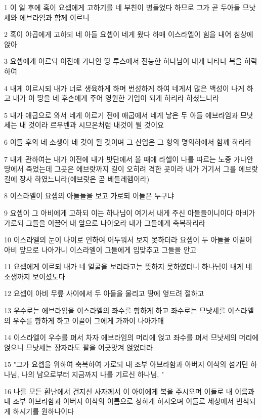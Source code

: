 \par 1 이 일 후에 혹이 요셉에게 고하기를 네 부친이 병들었다 하므로 그가 곧 두아들 므낫세와 에브라임과 함께 이르니
\par 2 혹이 야곱에게 고하되 네 아들 요셉이 네게 왔다 하매 이스라엘이 힘을 내어 침상에 앉아
\par 3 요셉에게 이르되 이전에 가나안 땅 루스에서 전능한 하나님이 내게 나타나 복을 허락하여
\par 4 내게 이르시되 내가 너로 생육하게 하며 번성하게 하여 네게서 많은 백성이 나게 하고 내가 이 땅을 네 후손에게 주어 영원한 기업이 되게 하리라 하셨느니라
\par 5 내가 애굽으로 와서 네게 이르기 전에 애굽에서 네게 낳은 두 아들 에브라임과 므낫세는 내 것이라 르우벤과 시므온처럼 내것이 될 것이요
\par 6 이들 후의 네 소생이 네 것이 될 것이며 그 산업은 그 형의 명의하에서 함께 하리라
\par 7 내게 관하여는 내가 이전에 내가 밧단에서 올 때에 라헬이 나를 따르는 노중 가나안 땅에서 죽었는데 그곳은 에브랏까지 길이 오히려 격한 곳이라 내가 거기서 그를 에브랏 길에 장사 하였느니라(에브랏은 곧 베들레헴이라)
\par 8 이스라엘이 요셉의 아들들을 보고 가로되 이들은 누구냐
\par 9 요셉이 그 아비에게 고하되 이는 하나님이 여기서 내게 주신 아들들이니이다 아비가 가로되 그들을 이끌어 내 앞으로 나아오라 내가 그들에게 축복하리라
\par 10 이스라엘의 눈이 나이로 인하여 어두워서 보지 못하더라 요셉이 두 아들을 이끌어 아비 앞으로 나아가니 이스라엘이 그들에게 입맞추고 그들을 안고
\par 11 요셉에게 이르되 내가 네 얼굴을 보리라고는 뜻하지 못하였더니 하나님이 내게 네 소생까지 보이셨도다
\par 12 요셉이 아비 무릎 사이에서 두 아들을 물리고 땅에 엎드려 절하고
\par 13 우수로는 에브라임을 이스라엘의 좌수를 향하게 하고 좌수로는 므낫세를 이스라엘의 우수를 향하게 하고 이끌어 그에게 가까이 나아가매
\par 14 이스라엘이 우수를 펴서 차자 에브라임의 머리에 얹고 좌수를 펴서 므낫세의 머리에 얹으니 므낫세는 장자라도 팔을 어긋맞겨 얹었더라
\par 15 "그가 요셉을 위하여 축복하여 가로되 내 조부 아브라함과 아버지 이삭의 섬기던 하나님, 나의 남으로부터 지금까지 나를 기르신 하나님, "
\par 16 나를 모든 환난에서 건지신 사자께서 이 아이에게 복을 주시오며 이들로 내 이름과 내 조부 아브라함과 아버지 이삭의 이름으로 칭하게 하시오며 이들로 세상에서 번식되게 하시기를 원하나이다
